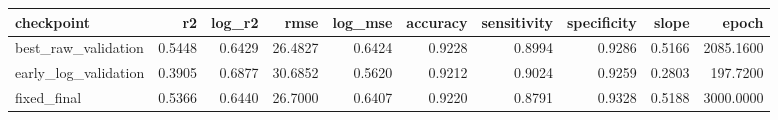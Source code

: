\begin{tabular}{lrrrrrrrrr}
\toprule
checkpoint & r2 & log\_r2 & rmse & log\_mse & accuracy & sensitivity & specificity & slope & epoch \\
\midrule
best\_raw\_validation & 0.5448 & 0.6429 & 26.4827 & 0.6424 & 0.9228 & 0.8994 & 0.9286 & 0.5166 & 2085.1600 \\
early\_log\_validation & 0.3905 & 0.6877 & 30.6852 & 0.5620 & 0.9212 & 0.9024 & 0.9259 & 0.2803 & 197.7200 \\
fixed\_final & 0.5366 & 0.6440 & 26.7000 & 0.6407 & 0.9220 & 0.8791 & 0.9328 & 0.5188 & 3000.0000 \\
\bottomrule
\end{tabular}
